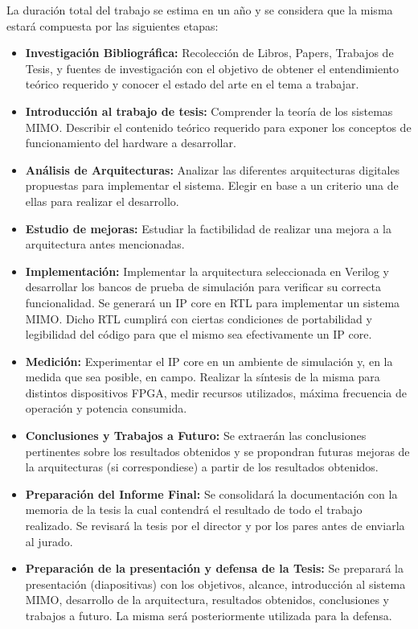 \documentclass[a4paper]{article}
\begin{document}

La duración total del trabajo se estima en un año y se considera que la misma estará compuesta por las siguientes etapas:

\begin{itemize}
    \item \textbf{Investigación Bibliográfica:} Recolección de Libros, Papers, Trabajos de Tesis, y fuentes de investigación con el objetivo de obtener el entendimiento teórico requerido y conocer el estado del arte en el tema a trabajar.
    \item \textbf{Introducción al trabajo de tesis:} Comprender la teoría de los sistemas MIMO. Describir el contenido teórico requerido para exponer los conceptos de funcionamiento del hardware a desarrollar.
    \item \textbf{Análisis de Arquitecturas:} Analizar las diferentes arquitecturas digitales propuestas para implementar el sistema. Elegir en base a un criterio una de ellas para realizar el desarrollo.
    \item \textbf{Estudio de mejoras:} Estudiar la factibilidad de realizar una mejora a la arquitectura antes mencionadas.
    \item \textbf{Implementación:} Implementar la arquitectura seleccionada en Verilog y desarrollar los bancos de prueba de simulación para verificar su correcta funcionalidad. Se generará un IP core en RTL para implementar un sistema MIMO. Dicho RTL cumplirá con ciertas condiciones de portabilidad y legibilidad del código para que el mismo sea efectivamente un IP core.
    \item \textbf{Medición:} Experimentar el IP core en un ambiente de simulación y, en la medida que sea posible, en campo. Realizar la síntesis de la misma para distintos dispositivos FPGA, medir recursos utilizados, máxima frecuencia de operación y potencia consumida.
    \item \textbf{Conclusiones y Trabajos a Futuro:} Se extraerán las conclusiones pertinentes sobre los resultados obtenidos y se propondran futuras mejoras de la arquitecturas (si correspondiese) a partir de los resultados obtenidos.
    \item \textbf{Preparación del Informe Final:} Se consolidará la documentación con la memoria de la tesis la cual contendrá el resultado de todo el trabajo realizado. Se revisará la tesis por el director y por los pares antes de enviarla al jurado.
    \item \textbf{Preparación de la presentación y defensa de la Tesis:} Se preparará la presentación (diapositivas) con los objetivos, alcance, introducción al sistema MIMO, desarrollo de la arquitectura, resultados obtenidos, conclusiones y trabajos a futuro. La misma será posteriormente utilizada para la defensa.
\end{itemize}
\end{document}
